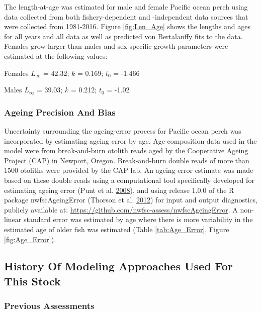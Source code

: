 \documentclass[12pt,]{article}
\begin{document}
The length-at-age was estimated for male and female Pacific ocean perch
using data collected from both fishery-dependent and -independent data
sources that were collected from 1981-2016. Figure \ref{fig:Len_Age}
shows the lengths and ages for all years and all data as well as
predicted von Bertalanffy fits to the data. Females grow larger than
males and sex specific growth parameters were estimated at the following
values:

\begin{centering}

Females $L_{\infty}$ = 42.32; $k$ = 0.169; $t_0$ = -1.466

Males $L_{\infty}$ = 39.03; $k$ = 0.212; $t_0$ = -1.02

\end{centering}

\subsubsection{Ageing Precision And
Bias}\label{ageing-precision-and-bias}

Uncertainty surrounding the ageing-error process for Pacific ocean perch
was incorporated by estimating ageing error by age. Age-composition data
used in the model were from break-and-burn otolith reads aged by the
Cooperative Ageing Project (CAP) in Newport, Oregon. Break-and-burn
double reads of more than 1500 otoliths were provided by the CAP lab. An
ageing error estimate was made based on these double reads using a
computational tool specifically developed for estimating ageing error
(Punt et al. \protect\hyperlink{ref-punt_quantifying_2008}{2008}), and
using release 1.0.0 of the R package nwfscAgeingError (Thorson et al.
\protect\hyperlink{ref-thorson_nwfscageingerror:_2012}{2012}) for input
and output diagnostics, publicly available at:
\url{https://github.com/nwfsc-assess/nwfscAgeingError}. A non-linear
standard error was estimated by age where there is more variability in
the estimated age of older fish was estimated (Table
\ref{tab:Age_Error}, Figure \ref{fig:Age_Error}).

\subsection{History Of Modeling Approaches Used For This
Stock}\label{history-of-modeling-approaches-used-for-this-stock}

\subsubsection{Previous Assessments}\label{previous-assessments}
\end{document}
